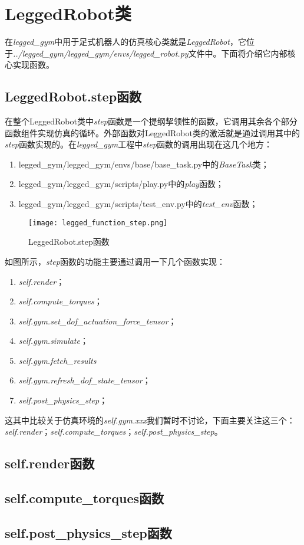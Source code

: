 \section[LeggedRobot类]{LeggedRobot类}
在\emph{legged\_gym}中用于足式机器人的仿真核心类就是\emph{LeggedRobot}，它位于\emph{../legged\_gym/legged\_gym/envs/legged\_robot.py}文件中。下面将介绍它内部核心实现函数。

\subsection[LeggedRobot.step函数]{LeggedRobot.step函数}
在整个LeggedRobot类中\emph{step}函数是一个提纲挈领性的函数，它调用其余各个部分函数组件实现仿真的循环。外部函数对LeggedRobot类的激活就是通过调用其中的\emph{step}函数实现的。在\emph{legged\_gym}工程中\emph{step}函数的调用出现在这几个地方：\begin{enumerate}
  \item legged\_gym/legged\_gym/envs/base/base\_task.py中的\emph{BaseTask}类；
  \item legged\_gym/legged\_gym/scripts/play.py中的\emph{play}函数；
  \item legged\_gym/legged\_gym/scripts/test\_env.py中的\emph{test\_env}函数；
\end{enumerate}

\begin{figure}
  \centering
  \caption[LeggedRobot.step函数]{LeggedRobot.step函数}
  \label{fig:legged_function_step}
  \texttt{[image: legged\_function\_step.png]}
\end{figure}

如图所示，\emph{step}函数的功能主要通过调用一下几个函数实现：\begin{enumerate}
  \item \emph{self.render}；
  \item \emph{self.compute\_torques}；
  \item \emph{self.gym.set\_dof\_actuation\_force\_tensor}；
  \item \emph{self.gym.simulate}；
  \item \emph{self.gym.fetch\_results}
  \item \emph{self.gym.refresh\_dof\_state\_tensor}；
  \item \emph{self.post\_physics\_step}；
\end{enumerate}

这其中比较关于仿真环境的\emph{self.gym.xxx}我们暂时不讨论，下面主要关注这三个：\emph{self.render}；\emph{self.compute\_torques}；\emph{self.post\_physics\_step}。

\subsection[self.render函数]{self.render函数}

\subsection[self.compute\_torques函数]{self.compute\_torques函数}

\subsection[self.post\_physics\_step函数]{self.post\_physics\_step函数}











